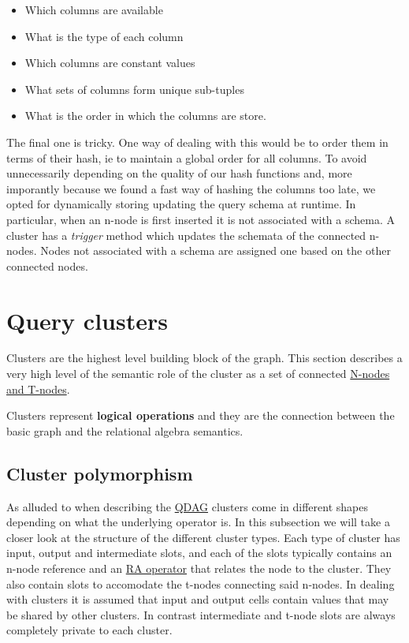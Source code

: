 \begin{itemize}
\item Which columns are available
\item What is the type of each column
\item Which columns are constant values
\item What sets of columns form unique sub-tuples
\item What is the order in which the columns are store.
\end{itemize}

The final one is tricky. One way of dealing with this would be to
order them in terms of their hash, ie to maintain a global order
for all columns. To avoid unnecessarily depending on the quality of
our hash functions and, more imporantly because we found a fast way
of hashing the columns too late, we opted for dynamically storing
updating the query schema at runtime. In particular, when an n-node
is first inserted it is not associated with a schema. A cluster has
a \emph{trigger} method which updates the schemata of the connected
n-nodes. Nodes not associated with a schema are assigned one based
on the other connected nodes.

\section{Query clusters}
\label{sec:org6e4b098}
Clusters are the highest level building block of the graph. This
section describes a very high level of the semantic role of the
cluster as a set of connected \hyperref[sec:org5a9ec3b]{N-nodes and
  T-nodes}.

Clusters represent \textbf{logical operations} and they are the connection
between the basic graph and the relational algebra semantics.

\subsection{Cluster polymorphism}
\label{sec:orgadee761}
As alluded to when describing the \hyperref[sec:org5a9ec3b]{QDAG}
clusters come in different shapes depending on what the underlying
operator is. In this subsection we will take a closer look at the
structure of the different cluster types. Each type of cluster has
input, output and intermediate slots, and each of the slots typically
contains an n-node reference and an
\hyperref[sec:relational_algebra_semantics]{RA operator} that relates
the node to the cluster. They also contain slots to accomodate the
t-nodes connecting said n-nodes. In dealing with clusters it is
assumed that input and output cells contain values that may be shared
by other clusters. In contrast intermediate and t-node slots are
always completely private to each cluster.

